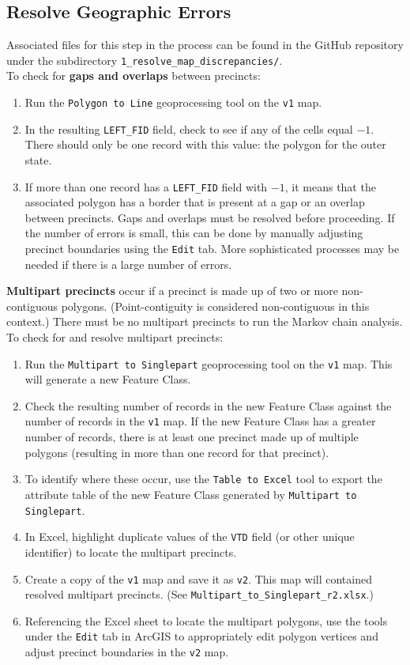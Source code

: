 \documentclass[11pt]{article}
\begin{document}
\subsection{Resolve Geographic Errors}
Associated files for this step in the process can be found in the GitHub repository under the subdirectory \verb|1_resolve_map_discrepancies/|.\\

To check for \textbf{gaps and overlaps} between precincts:
\begin{enumerate}
	\item Run the \verb|Polygon to Line| geoprocessing tool on the \verb|v1| map. 
	\item In the resulting \verb|LEFT_FID| field, check to see if any of the cells equal $-1$. There should only be one record with this value: the polygon for the outer state.
	\item If more than one record has a \verb|LEFT_FID| field with $-1$, it means that the associated polygon has a border that is present at a gap or an overlap between precincts. Gaps and overlaps must be resolved before proceeding. If the number of errors is small, this can be done by manually adjusting precinct boundaries using the \verb|Edit| tab. More sophisticated processes may be needed if there is a large number of errors.
\end{enumerate}

\textbf{Multipart precincts} occur if a precinct is made up of two or more non-contiguous polygons. (Point-contiguity is considered non-contiguous in this context.) There must be no multipart precincts to run the Markov chain analysis. To check for and resolve multipart precincts:
\begin{enumerate}
	\item Run the \verb|Multipart to Singlepart| geoprocessing tool on the \verb|v1| map. This will generate a new Feature Class.
	\item Check the resulting number of records in the new Feature Class against the number of records in the \verb|v1| map. If the new Feature Class has a greater number of records, there is at least one precinct made up of multiple polygons (resulting in more than one record for that precinct). 
	\item To identify where these occur, use the \verb|Table to Excel| tool to export the attribute table of the new Feature Class generated by \verb|Multipart to Singlepart|.
	\item In Excel, highlight duplicate values of the \verb|VTD| field (or other unique identifier) to locate the multipart precincts.
	\item Create a copy of the \verb|v1| map and save it as \verb|v2|. This map will contained resolved multipart precincts. (See \verb|Multipart_to_Singlepart_r2.xlsx|.)
	\item Referencing the Excel sheet to locate the multipart polygons, use the tools under the \verb|Edit| tab in ArcGIS to appropriately edit polygon vertices and adjust precinct boundaries in the \verb|v2| map. 
\end{enumerate}
\end{document}
